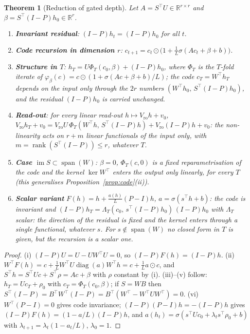 \documentclass[11pt,a4paper]{article}
\theoremstyle{plain}
\newtheorem{theorem}{Theorem}
\theoremstyle{definition}
\theoremstyle{remark}
\newcommand{\R}{\mathbb R}
\newcommand{\im}{\operatorname{im}}
\newcommand{\rank}{\operatorname{rank}}
\newcommand{\diag}{\operatorname{diag}}
\newcommand{\spn}{\operatorname{span}}
\newcommand{\T}{\top}
\begin{document}
\begin{theorem}[Reduction of gated depth]
\label{thm:A}
Let $A=S^\T U\in\R^{r\times r}$ and $\beta=S^\T(I-P)h_0\in\R^r$.
\begin{enumerate}
  \item[(i)] \textbf{Invariant residual}: $(I-P)h_t=(I-P)h_0$ for all $t$.
  \item[(ii)] \textbf{Code recursion in dimension $r$}:
  $c_{t+1}=c_t\odot\bigl(1+\tfrac1L\sigma(Ac_t+\beta+b)\bigr)$.
  \item[(iii)] \textbf{Structure in $T$}: $h_T=U\Phi_T(c_0,\beta)+(I-P)h_0$,
  where $\Phi_T$ is the $T$-fold iterate of
  $\varphi_\beta(c)=c\odot(1+\sigma(Ac+\beta+b)/L)$; the code $c_T=W^\T h_T$
  depends on the input only through the $2r$ numbers
  $(W^\T h_0,\,S^\T(I-P)h_0)$, and the residual $(I-P)h_0$ is carried
  unchanged.
  \item[(iv)] \textbf{Read-out}: for every linear read-out
  $h\mapsto V_{\mathrm{ro}}h+v_0$,
  $V_{\mathrm{ro}}h_T+v_0=V_{\mathrm{ro}}U\,\Phi_T(W^\T h,\,S^\T(I-P)h)+V_{\mathrm{ro}}(I-P)h+v_0$:
  the non-linearity acts on $r+m$ linear functionals of the input only, with
  $m=\rank(S^\T(I-P))\le r$, whatever $T$.
  \item[(v)] \textbf{Case $\im S\subset\spn(W)$}: $\beta=0$, $\Phi_T(c,0)$ is a
  fixed reparametrisation of the code and the kernel $\ker W^\T$ enters the
  output only linearly, for every $T$ (this generalises
  Proposition~\ref{prop:code}(ii)).
  \item[(vi)] \textbf{Scalar variant} $F(h)=h+\tfrac{a(h)}{L}(P-I)h$,
  $a=\sigma(s^\T h+b)$: the code is invariant and
  $(I-P)h_T=\Lambda_T(c_0,\,s^\T(I-P)h_0)\,(I-P)h_0$ with $\Lambda_T$ scalar:
  the \emph{direction} of the residual is fixed and the kernel enters through
  a single functional, whatever $s$. For $s\notin\spn(W)$ no closed form in
  $T$ is given, but the recursion is a scalar one.
\end{enumerate}
\end{theorem}
\begin{proof}
(i) $(I-P)U=U-UW^\T U=0$, so $(I-P)F(h)=(I-P)h$.
(ii) $W^\T F(h)=c+\tfrac1LW^\T U\diag(a)W^\T h=c+\tfrac1La\odot c$, and
$S^\T h=S^\T Uc+S^\T\rho=Ac+\beta$ with $\rho$ constant by (i).
(iii)--(v) follow: $h_T=Uc_T+\rho_0$ with $c_T=\Phi_T(c_0,\beta)$; if $S=WB$
then $S^\T(I-P)=B^\T W^\T(I-P)=B^\T(W^\T-W^\T UW^\T)=0$.
(vi) $W^\T(P-I)=0$ gives code invariance; $(I-P)(P-I)h=-(I-P)h$ gives
$(I-P)F(h)=(1-a/L)(I-P)h$, and $a(h_t)=\sigma(s^\T Uc_0+\lambda_ts^\T\rho_0+b)$
with $\lambda_{t+1}=\lambda_t(1-a_t/L)$, $\lambda_0=1$.
\end{proof}
\end{document}
